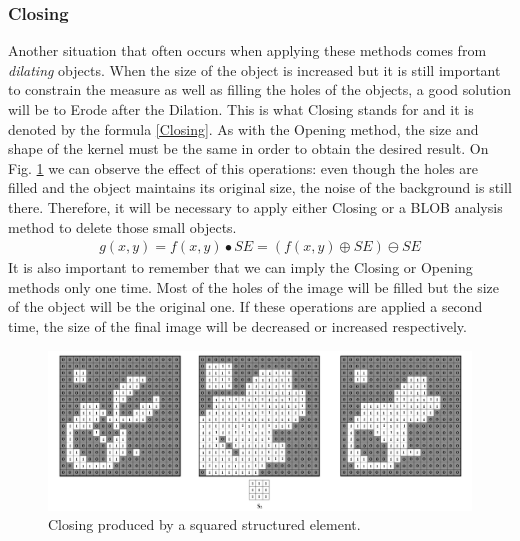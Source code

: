 \subsubsection{Closing}
Another situation that often occurs when applying these methods comes from \textit{dilating} objects. When the size of the object is increased but it is still important to constrain the measure as well as filling the holes of the objects, a good solution will be to Erode after the Dilation. This is what Closing stands for and it is denoted by the formula \ref{Closing}. As with the Opening method, the size and shape of the kernel must be the same in order to obtain the desired result.
On Fig. \ref{fig:Closing} we can observe the effect of this operations: even though the holes are filled and the object maintains its original size, the noise of the background is still there. Therefore, it will be necessary to apply either Closing or a BLOB analysis method to delete those small objects.
\begin{equation}
\begin{aligned}
{g(x,y)}={f(x,y)}\bullet{SE}=({f(x,y)}\oplus{SE})\ominus{SE}
\label{Closing}
	\end{aligned}
\end{equation}
It is also important to remember that we can imply the Closing or Opening methods only one time. Most of the holes of the image will be filled but the size of the object will be the original one. If these operations are applied a second time, the size of the final image will be decreased or increased respectively.

\begin{figure}[htbp]
\centering
\includegraphics[width=1\textwidth]{Pictures/Theory/ClosingSq.png}
\caption{Closing produced by a squared structured element.}
\label{fig:Closing}
\end{figure}

